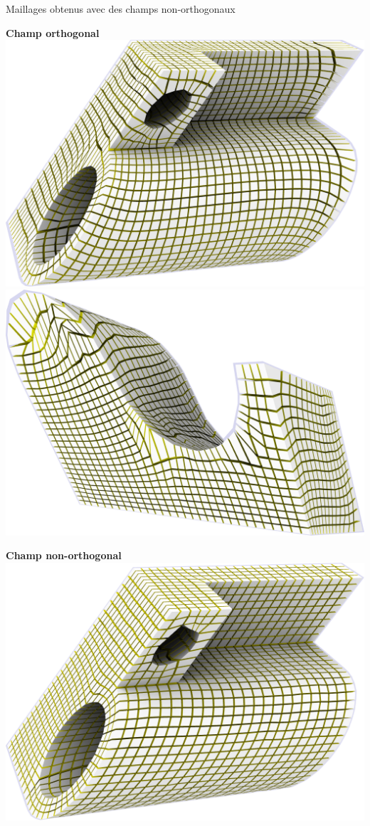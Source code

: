 \begin{frame}{Maillages obtenus avec des champs non-orthogonaux}
\begin{minipage}[c]{0.48\textwidth}
    \centering 
    \textbf{Champ orthogonal}\\
    \vspace{0.3cm}
    \includegraphics[width=.7\textwidth]{img_spm_ff/joint_ortho.png}
    \includegraphics[width=.7\textwidth]{img_spm_ff/shear_ortho.png}
    \end{minipage}%
    \hfill\vline\hfill
    \begin{minipage}[c]{0.48\textwidth}
    \centering 
    \textbf{Champ non-orthogonal}\\
    \vspace{0.3cm}
    \includegraphics[width=.7\textwidth]{img_spm_ff/joint_northo.png}

\end{minipage}
\end{frame}
